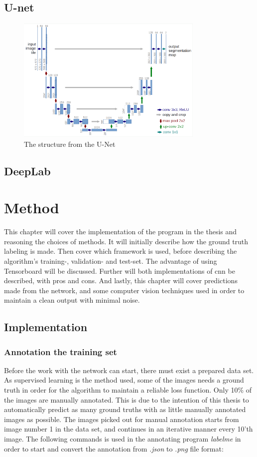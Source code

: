 \documentclass[USenglish]{ifimaster}  %
\begin{document}
\section{U-net}

\begin{figure}[ht]
    \centering
    \includegraphics[width=0.8\textwidth]{bilder/u_net.png}
    \caption{The structure from the U-Net \cite{website:u_net}}
    \label{fig:u_net}
\end{figure}

\section{DeepLab}

\chapter{Method}
This chapter will cover the implementation of the program in the thesis and reasoning the choices of methods. It will initially describe how the ground truth labeling is made. Then cover which framework is used, before describing the algorithm's training-, validation- and test-set. The advantage of using Tensorboard will be discussed. Further will both implementations of \ac{cnn} be described, with pros and cons. And lastly, this chapter will cover predictions made from the network, and some computer vision techniques used in order to maintain a clean output with minimal noise. 
\section{Implementation}
\subsection{Annotation the training set}
Before the work with the network can start, there must exist a prepared data set. As supervised learning is the method used, some of the images needs a ground truth in order for the algorithm to maintain a reliable loss function. Only 10\% of the images are manually annotated. This is due to the intention of this thesis to automatically predict as many ground truths with as little manually annotated images as possible. The images picked out for manual annotation starts from image number 1 in the data set, and continues in an iterative manner every 10'th image. The following commands is used in the annotating program \textit{labelme} in order to start and convert the annotation from \textit{.json} to \textit{.png} file format:   
\end{document}
